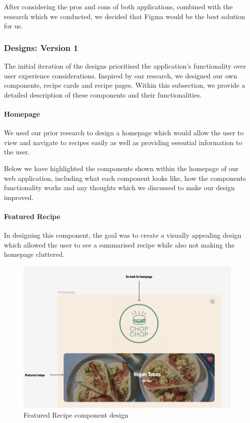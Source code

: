 \documentclass{article}
\begin{document}
After considering the pros and cons of both applications, combined with the research which we conducted, we decided that Figma would be the best solution for us.

\subsubsection{Designs: Version 1}
The initial iteration of the designs prioritised the application's functionality over user experience considerations. Inspired by our research, we designed our own components, recipe cards and recipe pages. Within this subsection, we provide a detailed description of these components and their functionalities.

\paragraph{Homepage}
We used our prior research to design a homepage which would allow the user to view and navigate to recipes easily as well as providing essential information to the user. 

Below we have highlighted the components shown within the homepage of our web application, including what each component looks like, how the components functionality works and any thoughts which we discussed to make our design improved.

\paragraph{Featured Recipe}
In designing this component, the goal was to create a visually appealing design which allowed the user to see a summarised recipe while also not making the homepage cluttered.

\begin{figure}[h]
  \includegraphics[width=1.0\textwidth]{assets/design-images/Version 1 Featured Recipe.png}
  \centering
  \caption{Featured Recipe component design}
\end{figure}
\end{document}
